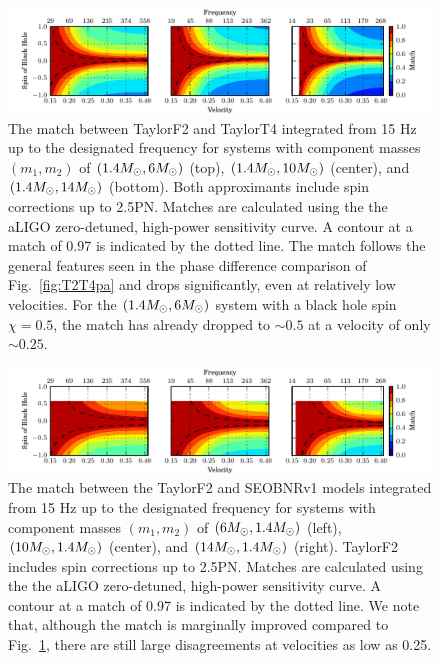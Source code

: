 \begin{figure}
\begin{center}
\centerline{\includegraphics[width=1.3\textwidth]{papers/nsbh_faithfulness/figure11.pdf}}
\end{center}
\caption{\label{fig:F2T4ma} The match between TaylorF2 and TaylorT4
integrated from 15 Hz up to the designated frequency for systems with component
masses $(m_1, m_2)$ of $(1.4M_\odot, 6M_\odot)$ (top), $(1.4M_\odot, 10M_\odot)$
(center), and $(1.4M_\odot, 14M_\odot)$ (bottom).  Both approximants include spin corrections up to 2.5\ac{PN}.
Matches are calculated using the the aLIGO
zero-detuned, high-power sensitivity curve. A contour at a match of 0.97 is
indicated by the dotted line.  The match follows the general features seen in
the phase difference comparison of Fig.~\ref{fig:T2T4pa} and drops
significantly, even at relatively low velocities. For the $(1.4M_\odot, 6M_\odot)$ system with a black
hole spin $\chi = 0.5 $, the match has already dropped to $\sim 0.5$ at a velocity of only $\sim 0.25$.
}
\end{figure}


\begin{figure}
\begin{center}
\centerline{\includegraphics[width=1.3\textwidth]{papers/nsbh_faithfulness/figure12.pdf}}
\end{center}
\caption{\label{fig:F2SEma} The match between the TaylorF2 and SEOBNRv1 models
integrated from 15 Hz up to the designated frequency for systems with component
masses $(m_1, m_2)$ of $(6M_\odot, 1.4M_\odot)$ (left), $(10M_\odot, 1.4M_\odot)$
(center), and $(14M_\odot, 1.4M_\odot)$ (right). TaylorF2 includes spin corrections up to 2.5\ac{PN}.
Matches are calculated using the the aLIGO
zero-detuned, high-power sensitivity curve. A contour at a match of 0.97 is
indicated by the dotted line. We note that, although the match is marginally
improved compared to Fig.~\ref{fig:F2T4ma}, there are still large
disagreements at velocities as low as 0.25.}

\end{figure}


